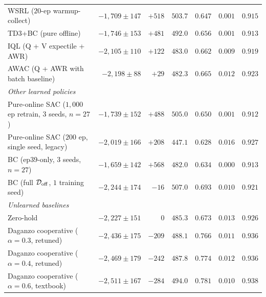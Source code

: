 \begin{table}[t]
{\begin{tabular}{lrrrrrr}
WSRL \citep{zhou2024wsrl} ($20$-ep warmup-collect)                  & $-1{,}709 \pm 147$ & $+518$ & $503.7$ & $0.647$ & $0.001$ & $0.915$ \\
TD3+BC \citep{fujimoto2021minimalist} (pure offline)               & $-1{,}746 \pm 153$ & $+481$ & $492.0$ & $0.656$ & $0.001$ & $0.913$ \\
IQL \citep{kostrikov2021offline} (Q + V expectile + AWR)           & $-2{,}105 \pm 110$ & $+122$ & $483.0$ & $0.662$ & $0.009$ & $0.919$ \\
AWAC \citep{nair2020awac} (Q + AWR with batch baseline)            & $-2{,}198 \pm 88$  & $+29$ & $482.3$ & $0.665$ & $0.012$ & $0.923$ \\
\midrule
\multicolumn{7}{l}{\emph{Other learned policies}} \\
Pure-online SAC ($1{,}000$ ep retrain, $3$ seeds, $n{=}27$)       & $-1{,}739 \pm 152$ & $+488$ & $505.0$ & $0.650$ & $0.001$ & $0.912$ \\
Pure-online SAC ($200$ ep, single seed, legacy)                   & $-2{,}019 \pm 166$ & $+208$ & $\mathbf{447.1}$ & $0.628$ & $0.016$ & $0.927$ \\
BC (ep39-only, $3$ seeds, $n{=}27$)                                & $-1{,}659 \pm 142$ & $+568$ & $482.0$ & $0.634$ & $\mathbf{0.000}$ & $0.913$ \\
BC (full $\mathcal{D}_{\mathrm{off}}$, $1$ training seed)                              & $-2{,}244 \pm 174$ & $-16$ & $507.0$ & $0.693$ & $0.010$ & $0.921$ \\
\midrule
\multicolumn{7}{l}{\emph{Unlearned baselines}} \\
Zero-hold                                                          & $-2{,}227 \pm 151$ & $0$ & $485.3$ & $0.673$ & $0.013$ & $0.926$ \\
Daganzo cooperative ($\alpha = 0.3$, retuned)                     & $-2{,}436 \pm 175$ & $-209$ & $488.1$ & $0.766$ & $0.011$ & $0.936$ \\
Daganzo cooperative ($\alpha = 0.4$, retuned)                     & $-2{,}469 \pm 179$ & $-242$ & $487.8$ & $0.774$ & $0.012$ & $0.936$ \\
Daganzo cooperative ($\alpha = 0.6$, textbook)                    & $-2{,}511 \pm 167$ & $-284$ & $494.0$ & $0.781$ & $0.010$ & $\mathbf{0.938}$ \\
\bottomrule
\end{tabular}%
}
\end{table}

